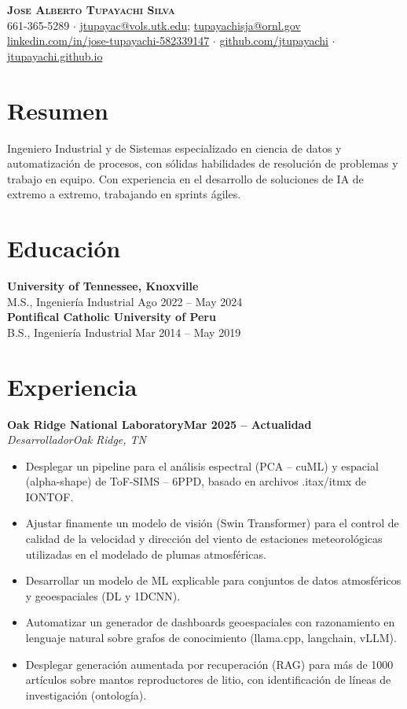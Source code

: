 \documentclass[10pt,letterpaper]{article}
\newcommand{\entry}[4]{%
  \vspace{3pt}\noindent\textbf{#1}\hfill\textbf{#2}\\[-1pt]
  \noindent\textit{#3}\hfill\textit{#4}\par\vspace{1pt}}
\begin{document}
\begin{center}
{\LARGE\bfseries\textsc{Jose Alberto Tupayachi Silva}}\\[4pt]
{\small 661-365-5289 $\cdot$ \href{mailto:jtupayac@vols.utk.edu}{jtupayac@vols.utk.edu}; \href{mailto:tupayachisja@ornl.gov}{tupayachisja@ornl.gov}\\
\href{https://www.linkedin.com/in/jose-tupayachi-582339147}{linkedin.com/in/jose-tupayachi-582339147} $\cdot$ \href{https://github.com/jtupayachi}{github.com/jtupayachi} $\cdot$ \href{https://jtupayachi.github.io/}{jtupayachi.github.io}}
\end{center}

\section{Resumen}
Ingeniero Industrial y de Sistemas especializado en ciencia de datos y automatización de procesos, con sólidas habilidades de resolución de problemas y trabajo en equipo. Con experiencia en el desarrollo de soluciones de IA de extremo a extremo, trabajando en sprints ágiles.

\section{Educación}
\vspace{2pt}
\textbf{University of Tennessee, Knoxville}\\
M.S., Ingeniería Industrial \hfill Ago 2022 -- May 2024\\[3pt]
\textbf{Pontifical Catholic University of Peru}\\
B.S., Ingeniería Industrial \hfill Mar 2014 -- May 2019

\section{Experiencia}
\entry{Oak Ridge National Laboratory}{Mar 2025 -- Actualidad}{Desarrollador}{Oak Ridge, TN}
\begin{itemize}
\item Desplegar un pipeline para el análisis espectral (PCA -- cuML) y espacial (alpha-shape) de ToF-SIMS -- 6PPD, basado en archivos .itax/itmx de IONTOF.
\item Ajustar finamente un modelo de visión (Swin Transformer) para el control de calidad de la velocidad y dirección del viento de estaciones meteorológicas utilizadas en el modelado de plumas atmosféricas.
\item Desarrollar un modelo de ML explicable para conjuntos de datos atmosféricos y geoespaciales (DL y 1DCNN).
\item Automatizar un generador de dashboards geoespaciales con razonamiento en lenguaje natural sobre grafos de conocimiento (llama.cpp, langchain, vLLM).
\item Desplegar generación aumentada por recuperación (RAG) para más de 1000 artículos sobre mantos reproductores de litio, con identificación de líneas de investigación (ontología).
\end{itemize}
\end{document}
